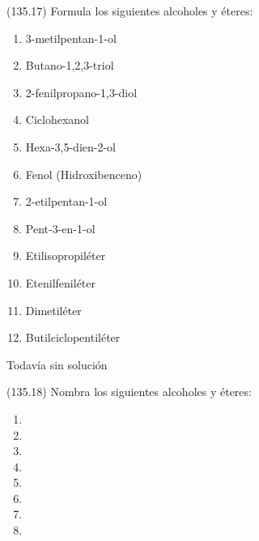 \documentclass[10pt,a5paper,twoside]{article}
\begin{document}
  \begin{exercise}[
      tags    = {},
      topics  = {química, química orgánica, orgánica},
      source  = {FQ 1B MGH 2016, p135, e17},
    ]
    (135.17) Formula los siguientes alcoholes y éteres:
    \begin{enumerate}
      \item 3-metilpentan-1-ol
      \item Butano-1,2,3-triol
      \item 2-fenilpropano-1,3-diol
      \item Ciclohexanol
      \item Hexa-3,5-dien-2-ol
      \item Fenol (Hidroxibenceno)
      \item 2-etilpentan-1-ol
      \item Pent-3-en-1-ol
      \item Etilisopropiléter
      \item Etenilfeniléter
      \item Dimetiléter
      \item Butilciclopentiléter
    \end{enumerate}
  \end{exercise}

  \begin{solution}[print=false]
    Todavía sin solución
  \end{solution}




  \begin{exercise}[
      tags    = {},
      topics  = {química, química orgánica, orgánica},
      source  = {FQ 1B MGH 2016, p135, e18},
    ]
    (135.18) Nombra los siguientes alcoholes y éteres:
    \begin{enumerate}
      \item {}
      \item {}
      \item {}
      \item {}
      \item {}
      \item {}
      \item {}
      \item {}
    \end{enumerate}
  \end{exercise}
\end{document}
